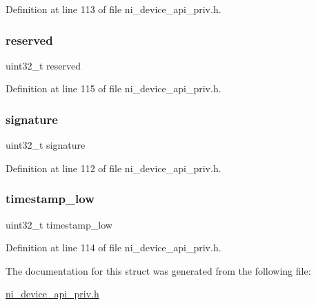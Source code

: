 Definition at line 113 of file ni\+\_\+device\+\_\+api\+\_\+priv.\+h.

\mbox{\label{struct__ni__encoder__metadata_aa43c4c21b173ada1b6b7568956f0d650}} 
\subsubsection{\texorpdfstring{reserved}{reserved}}
{\footnotesize\ttfamily uint32\+\_\+t reserved}



Definition at line 115 of file ni\+\_\+device\+\_\+api\+\_\+priv.\+h.

\mbox{\label{struct__ni__encoder__metadata_acd2a6284879dded65f0b8daa7c68485a}} 
\subsubsection{\texorpdfstring{signature}{signature}}
{\footnotesize\ttfamily uint32\+\_\+t signature}



Definition at line 112 of file ni\+\_\+device\+\_\+api\+\_\+priv.\+h.

\mbox{\label{struct__ni__encoder__metadata_a1ff0cbf7cccccf0c09bb61b349702d05}} 
\subsubsection{\texorpdfstring{timestamp\_low}{timestamp\_low}}
{\footnotesize\ttfamily uint32\+\_\+t timestamp\+\_\+low}



Definition at line 114 of file ni\+\_\+device\+\_\+api\+\_\+priv.\+h.



The documentation for this struct was generated from the following file\+:\begin{DoxyCompactItemize}
\item 
\mbox{\hyperlink{ni__device__api__priv_8h}{ni\+\_\+device\+\_\+api\+\_\+priv.\+h}}\end{DoxyCompactItemize}
